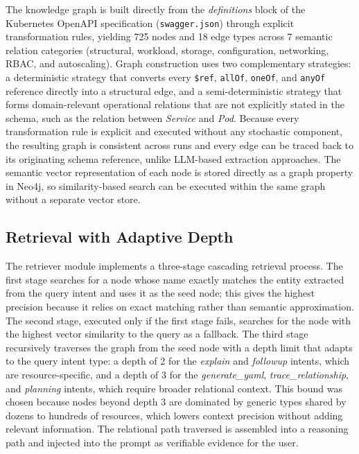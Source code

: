 \documentclass{ieeeaccess}
\begin{document}
The knowledge graph is built directly from the \textit{definitions} block of the Kubernetes OpenAPI specification (\texttt{swagger.json}) through explicit transformation rules, yielding 725 nodes and 18 edge types across 7 semantic relation categories (structural, workload, storage, configuration, networking, RBAC, and autoscaling). Graph construction uses two complementary strategies: a deterministic strategy that converts every \texttt{\$ref}, \texttt{allOf}, \texttt{oneOf}, and \texttt{anyOf} reference directly into a structural edge, and a semi-deterministic strategy that forms domain-relevant operational relations that are not explicitly stated in the schema, such as the relation between \textit{Service} and \textit{Pod}. Because every transformation rule is explicit and executed without any stochastic component, the resulting graph is consistent across runs and every edge can be traced back to its originating schema reference, unlike LLM-based extraction approaches. The semantic vector representation of each node is stored directly as a graph property in Neo4j, so similarity-based search can be executed within the same graph without a separate vector store.

\subsection{Retrieval with Adaptive Depth}

The retriever module implements a three-stage cascading retrieval process. The first stage searches for a node whose name exactly matches the entity extracted from the query intent and uses it as the seed node; this gives the highest precision because it relies on exact matching rather than semantic approximation. The second stage, executed only if the first stage fails, searches for the node with the highest vector similarity to the query as a fallback. The third stage recursively traverses the graph from the seed node with a depth limit that adapts to the query intent type: a depth of 2 for the \textit{explain} and \textit{followup} intents, which are resource-specific, and a depth of 3 for the \textit{generate\_yaml}, \textit{trace\_relationship}, and \textit{planning} intents, which require broader relational context. This bound was chosen because nodes beyond depth 3 are dominated by generic types shared by dozens to hundreds of resources, which lowers context precision without adding relevant information. The relational path traversed is assembled into a reasoning path and injected into the prompt as verifiable evidence for the user.
\end{document}
